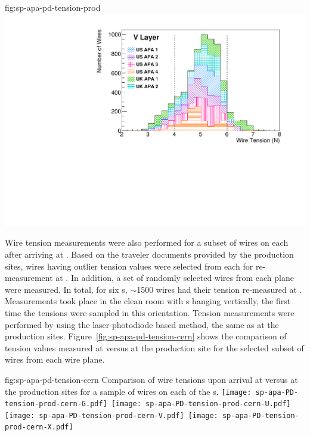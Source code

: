 \begin{dunefigure}{fig:sp-apa-pd-tension-prod}
\includegraphics[height=0.28\textheight,trim=0mm 0mm 0mm 0mm,clip]{graphics/sp-apa-V-layer-tensions.pdf}
\end{dunefigure}


Wire tension measurements were also performed for a subset of wires on each  after arriving at . Based on the traveler documents provided by the production sites, wires having outlier tension values were selected from each  for re-measurement at . In addition, a set of randomly selected wires from each plane were measured. In total, for six s, $\sim$1500 wires had their tension re-measured at . Measurements took place in the clean room with s hanging vertically, the first time the tensions were sampled in this orientation. Tension measurements were performed by using the laser-photodiode based method, the same as at the production sites. Figure~\ref{fig:sp-apa-pd-tension-cern} shows the comparison of tension values measured at  versus at the production site for the selected subset of wires from each wire plane.  

\begin{dunefigure}{fig:sp-apa-pd-tension-cern}
{Comparison of wire tensions upon arrival at  versus at the production sites for a sample of wires on each of the  s.}
\mbox{\texttt{[image: sp-apa-PD-tension-prod-cern-G.pdf]} %
\texttt{[image: sp-apa-PD-tension-prod-cern-U.pdf]}} \\
\vspace{3mm}
\mbox{\texttt{[image: sp-apa-PD-tension-prod-cern-V.pdf]} %
\texttt{[image: sp-apa-PD-tension-prod-cern-X.pdf]}}
\end{dunefigure}

